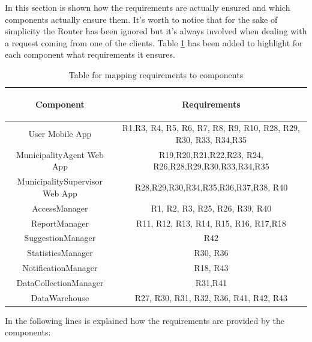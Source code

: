 \documentclass[a4paper]{report}
\begin{document}
In this section is shown how the requirements are actually ensured and which components actually ensure them. It's worth to notice that for the sake of simplicity the Router has been ignored but it's always involved when dealing with a request coming from one of the clients.
Table \ref{tab:req-trace} has been added to highlight for each component what requirements it ensures.
\begin{table}[H]  
  \centering
  \begin{tabular}{|c|c|}
    \cline{1-2}
   	\rule{0pt}{10pt} 
   	\begin{large}
    \textbf{Component} 
    \end{large}&\begin{large}
    \textbf{Requirements} 
    \end{large}\\  \hline
    User Mobile App &  R1,R3, R4, R5, R6, R7, R8, R9, R10, R28, R29, R30, R33, R34,R35\\ \hline
    MunicipalityAgent Web App & R19,R20,R21,R22,R23, R24, R26,R28,R29,R30,R33,R34,R35 \\ \hline
    MunicipalitySupervisor Web App & R28,R29,R30,R34,R35,R36,R37,R38, R40 \\ \hline
    AccessManager & R1, R2, R3, R25, R26, R39, R40 \\ \hline
    ReportManager & R11, R12, R13, R14, R15, R16, R17,R18\\ \hline
    SuggestionManager & R42 \\ \hline
    StatisticsManager & R30, R36 \\ \hline
    NotificationManager & R18, R43 \\ \hline
    DataCollectionManager & R31,R41 \\ \hline
    DataWarehouse & R27, R30, R31, R32, R36, R41, R42, R43 \\ \hline
    
  \end{tabular}
  \caption{Table for mapping requirements to components} \label{tab:req-trace}
\end{table}
In the following lines is explained how the requirements are provided by the components:
\end{document}
